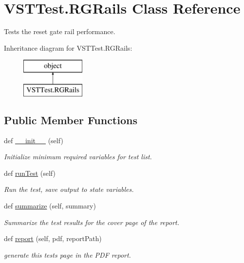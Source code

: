 \hypertarget{class_v_s_t_test_1_1_r_g_rails}{}\section{V\+S\+T\+Test.\+R\+G\+Rails Class Reference}
\label{class_v_s_t_test_1_1_r_g_rails}


Tests the reset gate rail performance.  


Inheritance diagram for V\+S\+T\+Test.\+R\+G\+Rails\+:\begin{figure}[H]
\begin{center}
\leavevmode
\includegraphics[height=2.000000cm]{class_v_s_t_test_1_1_r_g_rails}
\end{center}
\end{figure}
\subsection*{Public Member Functions}
\begin{DoxyCompactItemize}
\item 
def \hyperlink{class_v_s_t_test_1_1_r_g_rails_a85c267c8fae70d3556cb644b2d842443}{\+\_\+\+\_\+init\+\_\+\+\_\+} (self)
\begin{DoxyCompactList}\small\item\em Initialize minimum required variables for test list. \end{DoxyCompactList}\item 
def \hyperlink{class_v_s_t_test_1_1_r_g_rails_a1772c077dfe85be836e164434dcabcc1}{run\+Test} (self)
\begin{DoxyCompactList}\small\item\em Run the test, save output to state variables. \end{DoxyCompactList}\item 
def \hyperlink{class_v_s_t_test_1_1_r_g_rails_ae94665bd258b7b590bd41ccca4d4cb66}{summarize} (self, summary)
\begin{DoxyCompactList}\small\item\em Summarize the test results for the cover page of the report. \end{DoxyCompactList}\item 
def \hyperlink{class_v_s_t_test_1_1_r_g_rails_ad57a9f83959b1f24242f2179632b5c9f}{report} (self, pdf, report\+Path)
\begin{DoxyCompactList}\small\item\em generate this test\textquotesingle{}s page in the P\+DF report. \end{DoxyCompactList}\end{DoxyCompactItemize}


